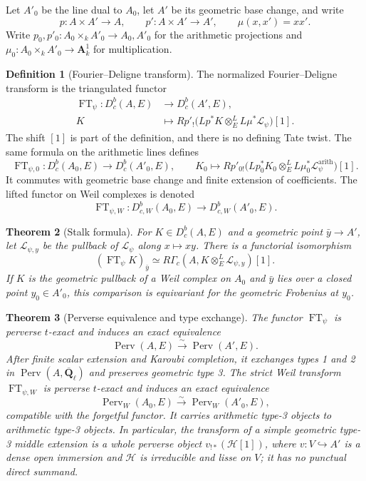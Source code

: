 \documentclass[10pt]{article}
\newtheorem{theorem}{Theorem}[section]
\theoremstyle{definition}
\newtheorem{definition}[theorem]{Definition}
\newcommand{\Qlb}{\overline{\mathbf Q}_\ell}
\newcommand{\Aone}{\mathbf A^1}
\newcommand{\Dbc}{D^b_c}
\newcommand{\DbcW}{D^b_{c,W}}
\newcommand{\Perv}{\operatorname{Perv}}
\newcommand{\PervW}{\operatorname{Perv}_W}
\newcommand{\FT}{\operatorname{FT}}
\newcommand{\RGammac}{R\Gamma_c}
\begin{document}
Let \(A'_0\) be the line dual to \(A_0\), let \(A'\) be its geometric base
change, and write
\[
 p:A\times A'\to A,\qquad p':A\times A'\to A',\qquad \mu(x,x')=xx'.
\]
Write \(p_0,p'_0:A_0\times_kA'_0\to A_0,A'_0\) for the arithmetic
projections and \(\mu_0:A_0\times_kA'_0\to\Aone_k\) for multiplication.

\begin{definition}[Fourier--Deligne transform]
The normalized Fourier--Deligne transform is the triangulated functor
\[
\begin{aligned}
 \FT_\psi:\Dbc(A,E)&\longrightarrow\Dbc(A',E),\\
 K&\longmapsto
 Rp'_!\bigl(Lp^*K\otimes_E^L L\mu^*\mathcal L_\psi\bigr)[1].
\end{aligned}
\]
The shift \([1]\) is part of the definition, and there is no defining Tate
twist.  The same formula on the arithmetic lines defines
\[
 \FT_{\psi,0}:\Dbc(A_0,E)\longrightarrow\Dbc(A'_0,E),
 \qquad
 K_0\longmapsto
 Rp'_{0!}\bigl(Lp_0^*K_0\otimes_E^L
 L\mu_0^*\mathcal L_\psi^{\mathrm{arith}}\bigr)[1].
\]
It commutes with geometric base change and finite extension of coefficients.
The lifted functor on Weil complexes is denoted
\[
 \FT_{\psi,W}:\DbcW(A_0,E)\longrightarrow\DbcW(A'_0,E).
\]
\end{definition}

\begin{theorem}[Stalk formula]
For \(K\in\Dbc(A,E)\) and a geometric point \(\bar y\to A'\), let
\(\mathcal L_{\psi,y}\) be the pullback of \(\mathcal L_\psi\) along
\(x\mapsto xy\).  There is a functorial isomorphism
\[
 (\FT_\psi K)_{\bar y}\simeq
       \RGammac(A,K\otimes_E^L\mathcal L_{\psi,y})[1].
\]
If \(K\) is the geometric pullback of a Weil complex on \(A_0\) and
\(\bar y\) lies over a closed point \(y_0\in A'_0\), this comparison is
equivariant for the geometric Frobenius at \(y_0\).
\end{theorem}

\begin{theorem}[Perverse equivalence and type exchange]
The functor \(\FT_\psi\) is perverse \(t\)-exact and induces an exact
equivalence
\[
                     \Perv(A,E)\xrightarrow{\sim}\Perv(A',E).
\]
After finite scalar extension and Karoubi completion, it exchanges types 1
and 2 in \(\Perv(A,\Qlb)\) and preserves geometric type 3.  The strict
Weil transform \(\FT_{\psi,W}\) is perverse \(t\)-exact and induces an
exact equivalence
\[
             \PervW(A_0,E)\xrightarrow{\sim}\PervW(A'_0,E),
\]
compatible with the forgetful functor.  It carries arithmetic type-3
objects to arithmetic type-3 objects.  In particular, the transform of a
simple geometric type-3 middle extension is a whole perverse object
\(v_{!*}(\mathcal H[1])\), where \(v:V\hookrightarrow A'\) is a dense
open immersion and \(\mathcal H\) is irreducible and lisse on \(V\); it
has no punctual direct summand.
\end{theorem}
\end{document}
